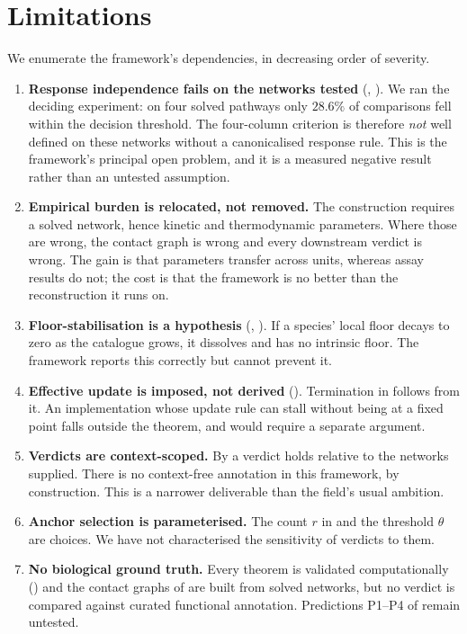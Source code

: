 \documentclass[11pt,twocolumn,a4paper]{article}
\theoremstyle{definition}
\theoremstyle{remark}
\begin{document}
\section{Limitations}
\label{sec:limits}

We enumerate the framework's dependencies, in decreasing order of severity.

\begin{enumerate}[label=\textbf{L\arabic*.},leftmargin=2.8em]
  \item \textbf{Response independence fails on the networks tested}
  (, ). We ran the deciding
  experiment: on four solved pathways only $28.6\%$ of comparisons fell
  within the decision threshold. The four-column criterion is therefore
  \emph{not} well defined on these networks without a canonicalised
  response rule. This is the framework's principal open problem, and it
  is a measured negative result rather than an untested assumption.
  \item \textbf{Empirical burden is relocated, not removed.} The
  construction requires a solved network, hence kinetic and thermodynamic
  parameters. Where those are wrong, the contact graph is wrong and every
  downstream verdict is wrong. The gain is that parameters transfer across
  units, whereas assay results do not; the cost is that the framework is
  no better than the reconstruction it runs on.
  \item \textbf{Floor-stabilisation is a hypothesis}
  (, ). If a species'
  local floor decays to zero as the catalogue grows, it dissolves and has
  no intrinsic floor. The framework reports this correctly but cannot
  prevent it.
  \item \textbf{Effective update is imposed, not derived}
  (). Termination in  follows from
  it. An implementation whose update rule can stall without being at a
  fixed point falls outside the theorem, and would require a separate
  argument.
  \item \textbf{Verdicts are context-scoped.} By  a
  verdict holds relative to the networks supplied. There is no
  context-free annotation in this framework, by construction. This is a
  narrower deliverable than the field's usual ambition.
  \item \textbf{Anchor selection is parameterised.} The count $r$ in
   and the threshold $\theta$ are choices. We have not
  characterised the sensitivity of verdicts to them.
  \item \textbf{No biological ground truth.} Every theorem is validated
  computationally () and the contact graphs of
   are built from solved networks, but no
  verdict is compared against curated functional annotation. Predictions
  P1--P4 of  remain untested.
\end{enumerate}
\end{document}
